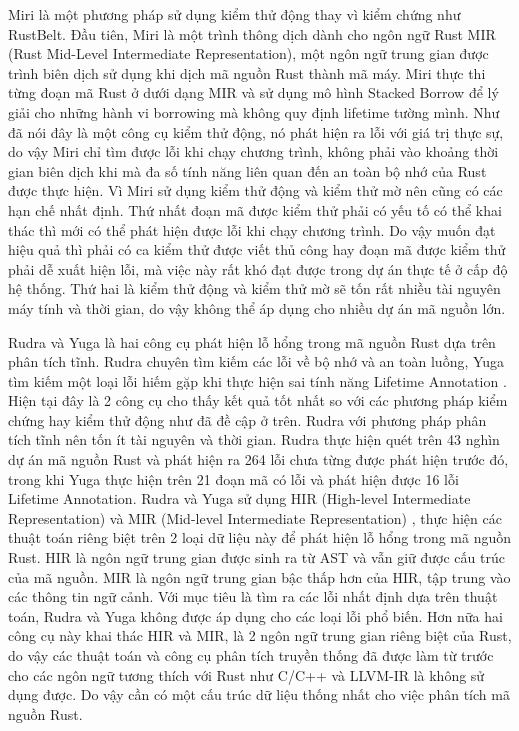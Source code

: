 Miri là một phương pháp sử dụng kiểm thử động thay vì kiểm chứng như RustBelt.
Đầu tiên, Miri là một trình thông dịch dành cho ngôn ngữ Rust MIR (Rust Mid-Level Intermediate Representation), một ngôn ngữ trung gian được trình biên dịch sử dụng khi dịch mã nguồn Rust thành mã máy.
Miri thực thi từng đoạn mã Rust ở dưới dạng MIR và sử dụng mô hình Stacked Borrow \cite{jung2019stacked} để lý giải cho những hành vi borrowing mà không quy định lifetime tường mình.
Như đã nói đây là một công cụ kiểm thử động, nó phát hiện ra lỗi với giá trị thực sự, do vậy Miri chỉ tìm được lỗi khi chạy chương trình, không phải vào khoảng thời gian biên dịch khi mà đa số tính năng liên quan đến an toàn bộ nhớ của Rust được thực hiện.
Vì Miri sử dụng kiểm thử động và kiểm thử mờ \cite{klees2018evaluating} nên cũng có các hạn chế nhất định.
Thứ nhất đoạn mã được kiểm thử phải có yếu tố có thể khai thác thì mới có thể phát hiện được lỗi khi chạy chương trình.
Do vậy muốn đạt hiệu quả thì phải có ca kiểm thử được viết thủ công hay đoạn mã được kiểm thử phải dễ xuất hiện lỗi, mà việc này rất khó đạt được trong dự án thực tế ở cấp độ hệ thống.
Thứ hai là kiểm thử động và kiểm thử mờ sẽ tốn rất nhiều tài nguyên máy tính và thời gian, do vậy không thể áp dụng cho nhiều dự án mã nguồn lớn.

Rudra và Yuga là hai công cụ phát hiện lỗ hổng trong mã nguồn Rust dựa trên phân tích tĩnh.
Rudra chuyên tìm kiếm các lỗi về bộ nhớ và an toàn luồng, Yuga tìm kiếm một loại lỗi hiếm gặp khi thực hiện sai tính năng Lifetime Annotation \cite{nitin2024uga}.
Hiện tại đây là 2 công cụ cho thấy kết quả tốt nhất so với các phương pháp kiểm chứng hay kiểm thử động như đã đề cập ở trên.
Rudra với phương pháp phân tích tĩnh nên tốn ít tài nguyên và thời gian.
Rudra thực hiện quét trên 43 nghìn dự án mã nguồn Rust và phát hiện ra 264 lỗi chưa từng được phát hiện trước đó, trong khi Yuga thực hiện trên 21 đoạn mã có lỗi và phát hiện được 16 lỗi Lifetime Annotation.
Rudra và Yuga sử dụng HIR (High-level Intermediate Representation) \cite{rustlangHighlevelRust} và MIR (Mid-level Intermediate Representation) \cite{rustlangMidlevelRust}, thực hiện các thuật toán riêng biệt trên 2 loại dữ liệu này để phát hiện lỗ hổng trong mã nguồn Rust.
HIR là ngôn ngữ trung gian được sinh ra từ AST và vẫn giữ được cấu trúc của mã nguồn.
MIR là ngôn ngữ trung gian bậc thấp hơn của HIR, tập trung vào các thông tin ngữ cảnh.
Với mục tiêu là tìm ra các lỗi nhất định dựa trên thuật toán, Rudra và Yuga không được áp dụng cho các loại lỗi phổ biến.
Hơn nữa hai công cụ này khai thác HIR và MIR, là 2 ngôn ngữ trung gian riêng biệt của Rust, do vậy các thuật toán và công cụ phân tích truyền thống đã được làm từ trước cho các ngôn ngữ tương thích với Rust như C/C++ và LLVM-IR là không sử dụng được.
Do vậy cần có một cấu trúc dữ liệu thống nhất cho việc phân tích mã nguồn Rust.

